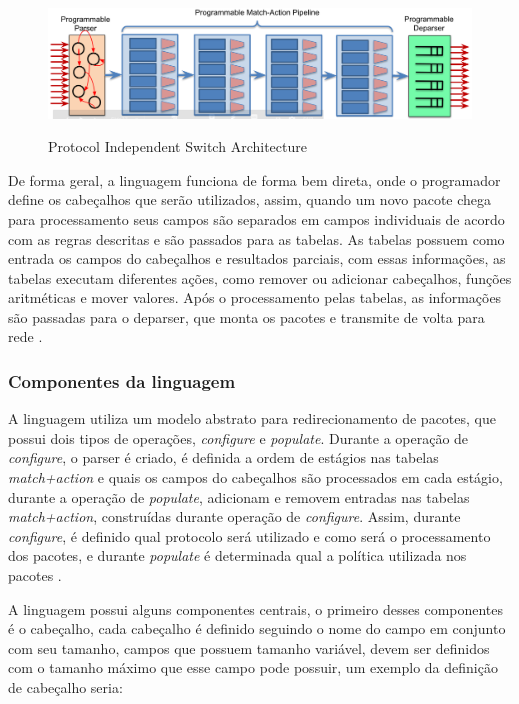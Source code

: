 \documentclass[
    12pt,
    openright, 
    oneside,
    a4paper,
    french,
    english,
    brazil
    ]{facom-ufu-abntex2}
\theoremstyle{definition}
\begin{document}

\begin{figure}[ht]
    \caption{Protocol Independent Switch Architecture \cite{paxos14spec}}
    \centering
    \includegraphics[width=\textwidth]{images/pisa.png}
    \label{fig:pisa-model}
\end{figure}

De forma geral, a linguagem funciona de forma bem direta, onde o programador define
os cabeçalhos que serão utilizados, assim, quando um novo pacote chega para processamento
seus campos são separados em campos individuais de acordo com as regras descritas e são
passados para as tabelas. As tabelas possuem como entrada os campos do cabeçalhos e 
resultados parciais, com essas informações, as tabelas executam diferentes ações,
como remover ou adicionar cabeçalhos, funções aritméticas e mover valores. Após o 
processamento pelas tabelas, as informações são passadas para o deparser, que 
monta os pacotes e transmite de volta para rede \cite{p4LangTutorial}.

\subsubsection{Componentes da linguagem}

A linguagem utiliza um modelo abstrato para redirecionamento de pacotes, que possui
dois tipos de operações, \emph{configure} e \emph{populate}. Durante a operação
de \emph{configure}, o parser é criado, é definida a ordem de estágios nas tabelas
\emph{match+action} e quais os campos do cabeçalhos são processados em cada estágio,
durante a operação de \emph{populate}, adicionam e removem entradas nas tabelas
\emph{match+action}, construídas durante operação de \emph{configure}. Assim,
durante \emph{configure}, é definido qual protocolo será utilizado e como será
o processamento dos pacotes, e durante \emph{populate} é determinada qual a 
política utilizada nos pacotes \cite{bosshart2014p4}.

A linguagem possui alguns componentes centrais, o primeiro desses componentes 
é o cabeçalho, cada cabeçalho é definido seguindo o nome do campo em conjunto 
com seu tamanho, campos que possuem tamanho variável, devem ser definidos com o
tamanho máximo que esse campo pode possuir, um exemplo da definição de cabeçalho
seria:
\end{document}
